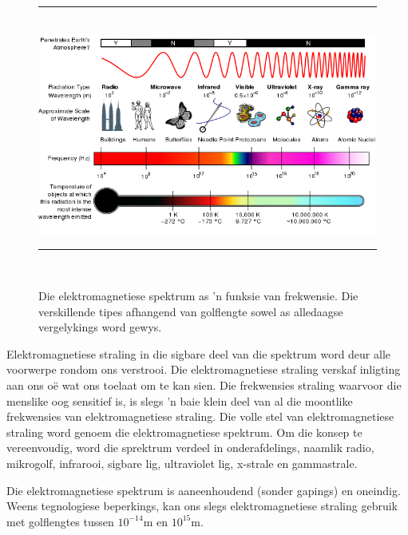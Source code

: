 \begin{figure}[H] %
\begin{center}
\rule[.1in]{\figurerulewidth}{.005in} \\
\includegraphics[width=\columnwidth]{col11305.imgs/m38778_EM_Spectrum_Properties_edit.png} %
\caption{Die elektromagnetiese spektrum as 'n funksie van frekwensie. Die verskillende tipes afhangend van golflengte  sowel as alledaagse vergelykings word gewys.}
\label{fig:emspectrum}
\rule[.1in]{\figurerulewidth}{.005in} \\
\end{center}
\end{figure}       


\label{m38778*id187230}E\-lek\-tro\-mag\-ne\-tie\-se straling in die sigbare deel van die spektrum word deur alle voorwerpe rondom ons verstrooi. Die elektromagnetiese straling verskaf inligting aan ons o\"e wat ons toelaat om te kan sien. Die frekwensies straling waarvoor die menslike oog sensitief is, is slegs 'n baie klein deel van al die moontlike frekwensies van e\-lek\-tro\-mag\-ne\-tie\-se straling. Die volle stel van e\-lek\-tro\-mag\-ne\-tie\-se straling word genoem die elektromagnetiese spektrum. Om die konsep te vereenvoudig, word die sprektrum verdeel in onderafdelings, naamlik radio, mikrogolf, infrarooi, sigbare lig, ultraviolet lig, x-strale en gammastrale. \par
 
\label{m38778*eip-855}Die e\-lek\-tro\-mag\-ne\-tie\-se spektrum is aaneenhoudend (sonder gapings) en oneindig. Weens tegnologiese beperkings, kan ons slegs elektromagnetiese straling gebruik met golflengtes tussen ${10}^{-14}\text{m}$ en ${10}^{15}\text{m}$.
           

